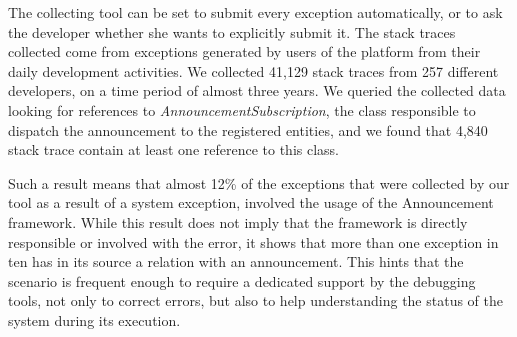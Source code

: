 
%


The collecting tool can be set to submit every exception automatically, or to ask the developer whether she wants to explicitly submit it.
The stack traces collected come from exceptions generated by users of the \pha platform from their daily development activities.
We collected 41,129 stack traces from 257 different developers, on a time period of almost three years.
We queried the collected data looking for references to \textit{AnnouncementSubscription}, the class responsible to dispatch the announcement to the registered entities, and we found that 4,840 stack trace contain at least one reference to this class.

Such a result means that almost 12\% of the exceptions that were collected by our tool as a result of a system exception, involved the usage of the Announcement framework.
While this result does not imply that the framework is directly responsible or involved with the error, it shows that more than one exception in ten has in its source a relation with an announcement.
This hints that the scenario is frequent enough to require a dedicated support by the debugging tools, not only to correct errors, but also to help understanding the status of the system during its execution.



